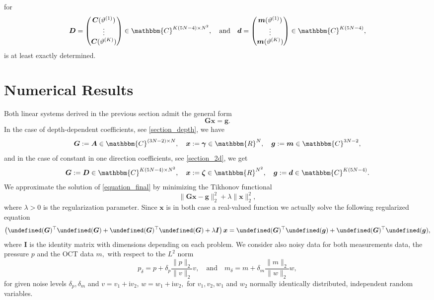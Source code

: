 \documentclass[a4paper,twoside,10pt]{article}
\theoremstyle{break}
\theoremstyle{nonumberplain}
\newcommand{\R}{\mathbbm{R}}
\newcommand{\C}{\mathbbm{C}}
\renewcommand{\b}{\bm}
\renewcommand{\i}{\mathrm i}
\let\RE\Re
\let\Re=\undefined
\DeclareMathOperator{\Re}{\RE e}
\let\IM\Im
\let\Im=\undefined
\DeclareMathOperator{\Im}{\IM m}
\begin{document}
for 
\begin{equation*}
\b D = \begin{pmatrix}
\b C (\vartheta^{(1)} ) \\ 
\vdots \\
\b C (\vartheta^{(K)} )
\end{pmatrix} \in \C^{K(5N-4)\times N^2}, \quad \text{and} \quad 
\b d = \begin{pmatrix}
\b m (\vartheta^{(1)} ) \\ 
\vdots \\
\b m (\vartheta^{(K)} )
\end{pmatrix} \in \C^{K(5N-4)},
\end{equation*}
is at least exactly determined. 


\section{Numerical Results}\label{section_results}

Both linear systems derived in the previous section admit the general form
\begin{equation}\label{equation_final}
\b G \b x = \b g .
\end{equation}
In the case of depth-dependent coefficients, see \autoref{section_depth}, we have
\[
\b G := \b A \in \C^{(3N-2)\times N}, \quad \b x := \bm \gamma \in \R^N , \quad \b g := \b m \in \C^{3N-2},
\]
and in the case of constant in one direction coefficients, see \autoref{section_2d}, we get
\[
\b G := \b D \in \C^{K(5N-4)\times N^2}, \quad \b x := \bm \zeta \in \R^{N^2}, \quad \b g := \b d \in \C^{K(5N-4)}.
\]
We approximate the solution of \eqref{equation_final} by minimizing the Tikhonov functional
\[ 
\| \b G \b x - \b g\|_2^2 + \lambda \| \b x \|_2^2 ,
\]
where $\lambda >0$ is the regularization parameter.  Since $\b x$ is in both case a real-valued function we actually solve the following regularized equation
\[
\left( \Re (\b G)^\top  \Re (\b G) + \Im (\b G)^\top  \Im (\b G)+ \lambda \b I \right) \b x =  \Re (\b G)^\top  \Re (\b g) + \Im (\b G)^\top  \Im (\b g) ,
\]
where $\b I$ is the identity matrix with dimensions depending on each problem. We consider also noisy data for both measurements data, the pressure $p$ and the OCT data $m,$ with respect to the $L^2$ norm
\[
p_\delta = p + \delta_p \frac{\|  p \|_2}{\|  v \|_2} v , \quad 
\text{and} \quad m_\delta = m + \delta_m \frac{\|  m \|_2}{\|  w \|_2} w ,
\]
for given noise levels $\delta_p , \delta_m$ and $v = v_1 + \i v_2, \, w = w_1 + \i w_2,$ for $v_1 , v_2 , w_1$ and $w_2$ normally identically distributed, independent random variables. 
\end{document}
